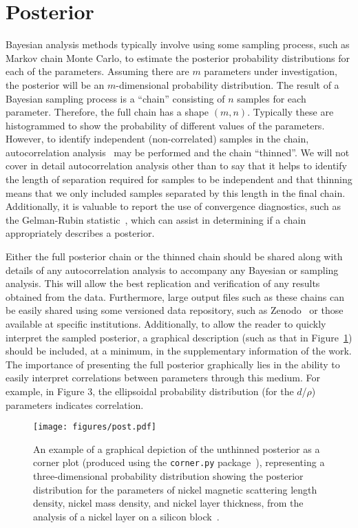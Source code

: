 \documentclass[reprint,superscriptaddress,aps,amsmath]{revtex4-2}
\begin{document}
\section{Posterior}\label{sec:posterior}

Bayesian analysis methods typically involve using some sampling process, such as Markov chain Monte Carlo, to estimate the posterior probability distributions for each of the parameters. 
Assuming there are $m$ parameters under investigation, the posterior will be an $m$-dimensional probability distribution. 
The result of a Bayesian sampling process is a ``chain'' consisting of $n$ samples for each parameter. 
Therefore, the full chain has a shape $(m, n)$. 
Typically these are histogrammed to show the probability of different values of the parameters. 
However, to identify independent (non-correlated) samples in the chain, autocorrelation analysis~\cite{sokal_monte_1997} may be performed and the chain ``thinned''. 
We will not cover in detail autocorrelation analysis other than to say that it helps to identify the length of separation required for samples to be independent and that thinning means that we only included samples separated by this length in the final chain.
Additionally, it is valuable to report the use of convergence diagnostics, such as the Gelman-Rubin statistic~\cite{gelman_inference_1992}, which can assist in determining if a chain appropriately describes a posterior. 

Either the full posterior chain or the thinned chain should be shared along with details of any autocorrelation analysis to accompany any Bayesian or sampling analysis. 
This will allow the best replication and verification of any results obtained from the data. 
Furthermore, large output files such as these chains can be easily shared using some versioned data repository, such as Zenodo~\cite{european_zenodo_2013} or those available at specific institutions. 
Additionally, to allow the reader to quickly interpret the sampled posterior, a graphical description (such as that in Figure~\ref{fig:post}) should be included, at a minimum, in the supplementary information of the work. 
The importance of presenting the full posterior graphically lies in the ability to easily interpret correlations between parameters through this medium.
For example, in Figure 3, the ellipsoidal probability distribution (for the $d$/$\rho$) parameters indicates correlation.
%
\begin{figure}
  \texttt{[image: figures/post.pdf]}
  \caption{
    An example of a graphical depiction of the unthinned posterior as a corner plot (produced using the \texttt{corner.py} package~\cite{foremanmackey_corner_2016}), representing a three-dimensional probability distribution showing the posterior distribution for the parameters of nickel magnetic scattering length density, nickel mass density, and nickel layer thickness, from the analysis of a nickel layer on a silicon block~\cite{caruana_zenodo_2022}.
  }\label{fig:post}
\end{figure}
%
\end{document}
